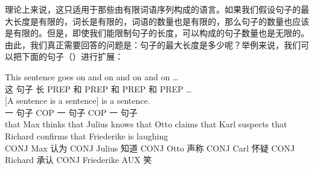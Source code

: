 理论上来说，这只适用于那些由有限词语序列构成的语言。如果我们假设句子的最大长度是有限的，词长是有限的，词语的数量也是有限的，那么句子的数量也应该是有限的。但是，即使我们能限制句子的长度，可以构成的句子数量也是无限的。由此，我们真正需要回答的问题是：句子的最大长度是多少呢？举例来说，我们可以把下面的句子（）进行扩展：

\eal 
\ex 
\gll This sentence goes on and on and on and on \ldots \\
       这 句子 长 PREP 和 PREP 和 PREP 和 PREP \ldots \\
\ex
\gll  {}[A sentence is a sentence] is a sentence. \\
      {}一 句子 COP 一 句子 COP 一 句子\\
\ex\label{einbettung-dass-Saetze}
\gll that Max thinks that Julius knows that Otto claims that Karl suspects that Richard confirms that Friederike is laughing\\
      CONJ Max 认为 CONJ Julius 知道 CONJ Otto 声称 CONJ Carl 怀疑 CONJ Richard 承认 CONJ Friederike AUX 笑\\
\zl

